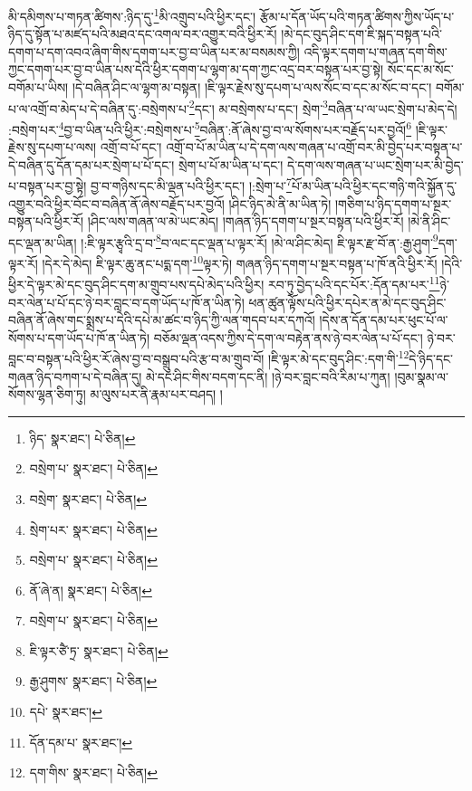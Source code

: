 མི་དམིགས་པ་གཏན་ཚིགས་:ཉིད་དུ་\footnote{ཉིད་  སྣར་ཐང་།  པེ་ཅིན། }མི་འགྲུབ་པའི་ཕྱིར་དང་། རྩོམ་པ་དོན་ཡོད་པའི་གཏན་ཚིགས་ཀྱིས་ཡོད་པ་ཉིད་དུ་སྟོན་པ་མཛད་པའི་མཐའ་དང་འགལ་བར་འགྱུར་བའི་ཕྱིར་རོ། །མེ་དང་བུད་ཤིང་དག་ཇི་སྐད་བསྟན་པའི་དགག་པ་དག་འབའ་ཞིག་གིས་དགག་པར་བྱ་བ་ཡིན་པར་མ་བསམས་ཀྱི། འདི་ལྟར་དགག་པ་གཞན་དག་གིས་ཀྱང་དགག་པར་བྱ་བ་ཡིན་པས་དེའི་ཕྱིར་དགག་པ་ལྷག་མ་དག་ཀྱང་འདྲ་བར་བསྟན་པར་བྱ་སྟེ། སོང་དང་མ་སོང་བགོམ་པ་ཡིས། །དེ་བཞིན་ཤིང་ལ་ལྷག་མ་བསྟན། །ཇི་ལྟར་རྗེས་སུ་དཔག་པ་ལས་སོང་བ་དང་མ་སོང་བ་དང་། བགོམ་པ་ལ་འགྲོ་བ་མེད་པ་དེ་བཞིན་དུ་:བསྲེགས་པ་\footnote{བསྲེག་པ་  སྣར་ཐང་།  པེ་ཅིན། }དང་། མ་བསྲེགས་པ་དང་། སྲེག་\footnote{བསྲེག་  སྣར་ཐང་།  པེ་ཅིན། }བཞིན་པ་ལ་ཡང་སྲེག་པ་མེད་དེ། :བསྲེག་པར་\footnote{སྲེག་པར་  སྣར་ཐང་།  པེ་ཅིན། }བྱ་བ་ཡིན་པའི་ཕྱིར་:བསྲེགས་པ་\footnote{བསྲེག་པ་  སྣར་ཐང་།  པེ་ཅིན། }བཞིན་:ནོ་ཞེས་བྱ་བ་ལ་སོགས་པར་བརྗོད་པར་བྱའོ།\footnote{ནོ་ཞེ་ན།  སྣར་ཐང་།  པེ་ཅིན། } །ཇི་ལྟར་རྗེས་སུ་དཔག་པ་ལས། འགྲོ་བ་པོ་དང་། འགྲོ་བ་པོ་མ་ཡིན་པ་དེ་དག་ལས་གཞན་པ་འགྲོ་བར་མི་བྱེད་པར་བསྟན་པ་དེ་བཞིན་དུ་དོན་དམ་པར་སྲེག་པ་པོ་དང་། སྲེག་པ་པོ་མ་ཡིན་པ་དང་། དེ་དག་ལས་གཞན་པ་ཡང་སྲེག་པར་མི་བྱེད་པ་བསྟན་པར་བྱ་སྟེ། བྱ་བ་གཉིས་དང་མི་ལྡན་པའི་ཕྱིར་དང་། །:སྲེག་པ་\footnote{བསྲེག་པ་  སྣར་ཐང་།  པེ་ཅིན། }པོ་མ་ཡིན་པའི་ཕྱིར་དང་གཉི་གའི་སྐྱོན་དུ་འགྱུར་བའི་ཕྱིར་བོང་བ་བཞིན་ནོ་ཞེས་བརྗོད་པར་བྱའོ། །ཤིང་ཉིད་མེ་ནི་མ་ཡིན་ཏེ། །གཅིག་པ་ཉིད་དགག་པ་སྔར་བསྟན་པའི་ཕྱིར་རོ། །ཤིང་ལས་གཞན་ལ་མེ་ཡང་མེད། །གཞན་ཉིད་དགག་པ་སྔར་བསྟན་པའི་ཕྱིར་རོ། །མེ་ནི་ཤིང་དང་ལྡན་མ་ཡིན། །:ཇི་ལྟར་རྩྭའི་དྲ་བ་\footnote{ཇི་ལྟར་ཙཻ་ཏྲ་  སྣར་ཐང་།  པེ་ཅིན། }བ་ལང་དང་ལྡན་པ་ལྟར་རོ། །མེ་ལ་ཤིང་མེད། ཇི་ལྟར་རྫ་བོ་ན་:རྒྱ་ཤུག་\footnote{རྒྱ་ཤུགས་  སྣར་ཐང་།  པེ་ཅིན། }དག་ལྟར་རོ། །དེར་དེ་མེད། ཇི་ལྟར་ཆུ་ནང་པདྨ་དག་\footnote{དཔེ་  སྣར་ཐང་། }ལྟར་ཏེ། གཞན་ཉིད་དགག་པ་སྔར་བསྟན་པ་ཁོ་ནའི་ཕྱིར་རོ། །དེའི་ཕྱིར་དེ་ལྟར་མེ་དང་བུད་ཤིང་དག་མ་གྲུབ་པས་དཔེ་མེད་པའི་ཕྱིར། རབ་ཏུ་བྱེད་པའི་དང་པོར་:དོན་དམ་པར་\footnote{དོན་དམ་པ་  སྣར་ཐང་། }ཉེ་བར་ལེན་པ་པོ་དང་ཉེ་བར་བླང་བ་དག་ཡོད་པ་ཁོ་ན་ཡིན་ཏེ། ཕན་ཚུན་ལྟོས་པའི་ཕྱིར་དཔེར་ན་མེ་དང་བུད་ཤིང་བཞིན་ནོ་ཞེས་གང་སྨྲས་པ་དེའི་དཔེ་མ་ཚང་བ་ཉིད་ཀྱི་ལན་གདབ་པར་དཀའོ། །དེས་ན་དོན་དམ་པར་ཕུང་པོ་ལ་སོགས་པ་དག་ཡོད་པ་ཁོ་ན་ཡིན་ཏེ། བཅོམ་ལྡན་འདས་ཀྱིས་དེ་དག་ལ་བརྟེན་ནས་ཉེ་བར་ལེན་པ་པོ་དང་། ཉེ་བར་བླང་བ་བསྟན་པའི་ཕྱིར་རོ་ཞེས་བྱ་བ་བསྒྲུབ་པའི་རྩ་བ་མ་གྲུབ་བོ། །ཇི་ལྟར་མེ་དང་བུད་ཤིང་:དག་གི་\footnote{དག་གིས་  སྣར་ཐང་།  པེ་ཅིན། }དེ་ཉིད་དང་གཞན་ཉིད་བཀག་པ་དེ་བཞིན་དུ། མེ་དང་ཤིང་གིས་བདག་དང་ནི། །ཉེ་བར་བླང་བའི་རིམ་པ་ཀུན། །བུམ་སྣམ་ལ་སོགས་ལྷན་ཅིག་ཏུ། མ་ལུས་པར་ནི་རྣམ་པར་བཤད། །
